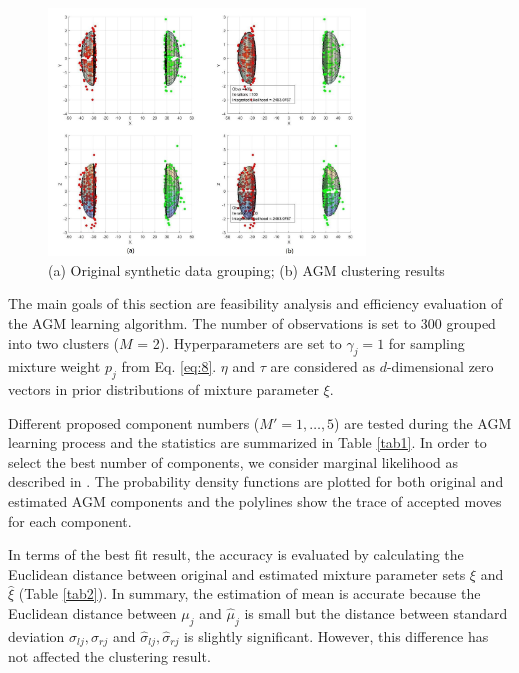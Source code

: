 \begin{figure}
\includegraphics[width=0.75\textwidth]{xyzMerge.jpg}
\caption{(a) Original synthetic data grouping; (b) AGM clustering results}
\label{fig:syn2}
\end{figure}
The main goals of this section are feasibility analysis and efficiency evaluation of the AGM learning algorithm. The number of observations is set to 300 grouped into two clusters ($M$ = 2). Hyperparameters are set to $\gamma_j = 1$ \cite{Stephens2000} for sampling mixture weight $p_j$ from Eq. \eqref{eq:8}. $\eta$ and $\tau$ are considered as $d$-dimensional zero vectors in prior distributions of mixture parameter $\xi$.

Different proposed component numbers ($M' = 1,\dots,5$) are tested during the AGM learning process and the statistics are summarized in Table \ref{tab1}. In order to select the best number of components, we consider marginal likelihood as described in \cite{Bouguila2009}. The probability density functions are plotted for both original and estimated AGM components and the polylines show the trace of accepted moves for each component.

In terms of the best fit result, the accuracy is evaluated by calculating the Euclidean distance between original and estimated mixture parameter sets $\xi$ and $\hat{\xi}$ (Table \ref{tab2}). In summary, the estimation of mean is accurate because the Euclidean distance between $\mu_j$ and $\hat{\mu}_j$ is small but the distance between standard deviation $\sigma_{lj}, \sigma_{rj}$ and $\hat{\sigma}_{lj}, \hat{\sigma}_{rj}$ is slightly significant. However, this difference has not affected the clustering result.

